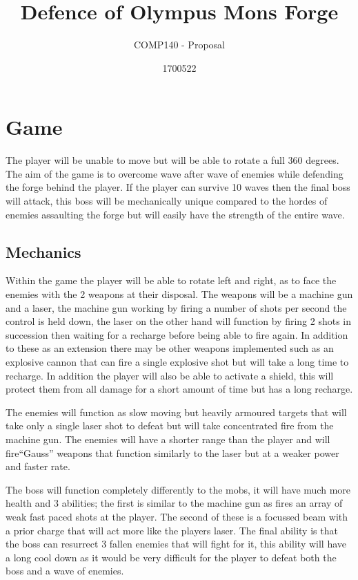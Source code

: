 \documentclass[10pt,a4paper]{scrartcl}
\title{Defence of Olympus Mons Forge}
\subtitle{COMP140 - Proposal}
\author{1700522}
\begin{document}
	\maketitle
	\section{Game}
			The player will be unable to move but will be able to rotate a full 360 degrees. The 	aim of the game is to overcome wave after wave of enemies while defending the forge behind 			the player. If the player can survive 10 waves then the final boss will attack, this boss 			will be mechanically unique compared to the hordes of enemies assaulting the forge but will 		easily have the strength of the entire wave.
	\subsection{Mechanics}
			Within the game the player will be able to rotate left and right, as to face the enemies with the 2 weapons at their disposal. The weapons will be a machine gun and a laser, the machine gun working by firing a number of shots per second the control is held down, the laser on the other hand will function by firing 2 shots in succession then waiting for a recharge before being able to fire again. In addition to these as an extension there may be other weapons implemented such as an explosive cannon that can fire a single explosive shot but will take a long time to recharge. In addition the player will also be able to activate a shield, this will protect them from all damage for a short amount of time but has a long recharge.
			
			The enemies will function as slow moving but heavily armoured targets that will take only a single laser shot to defeat but will take concentrated fire from the machine gun. The enemies will have a shorter range than the player and will fire``Gauss'' weapons that function similarly to the laser but at a weaker power and faster rate.
			
			The boss will function completely differently to the mobs, it will have much more health and 3 abilities; the first is similar to the machine gun as fires an array of weak fast paced shots at the player. The second of these is a focussed beam with a prior charge that will act more like the players laser. The final ability is that the boss can resurrect 3 fallen enemies that will fight for it, this ability will have a long cool down as it would be very difficult for the player to defeat both the boss and a wave of enemies.
\end{document}
